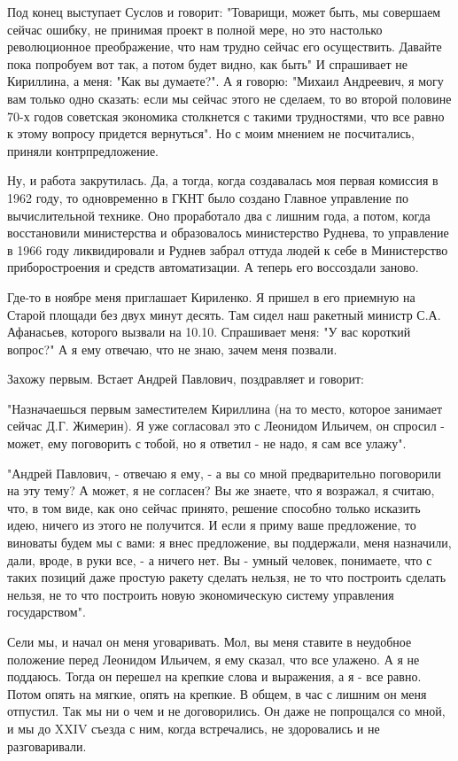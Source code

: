 Под конец выступает Суслов и говорит: "Товарищи, может быть, мы совершаем сейчас
ошибку, не принимая проект в полной мере, но это настолько революционное
преображение, что нам трудно сейчас его осуществить. Давайте пока попробуем вот
так, а потом будет видно, как быть" И спрашивает не Кириллина, а меня: "Как вы
думаете?". А я говорю: "Михаил Андреевич, я могу вам только одно сказать: если
мы сейчас этого не сделаем, то во второй половине 70-х годов советская экономика
столкнется с такими трудностями, что все равно к этому вопросу придется
вернуться". Но с моим мнением не посчитались, приняли контрпредложение.

Ну, и работа закрутилась. Да, а тогда, когда создавалась моя первая комиссия в
1962 году, то одновременно в ГКНТ было создано Главное управление по
вычислительной технике. Оно проработало два с лишним года, а потом, когда
восстановили министерства и образовалось министерство Руднева, то управление в
1966 году ликвидировали и Руднев забрал оттуда людей к себе в Министерство
приборостроения и средств автоматизации. А теперь его воссоздали заново.

Где-то в ноябре меня приглашает Кириленко. Я пришел в его приемную на Старой
площади без двух минут десять. Там сидел наш ракетный министр С.А. Афанасьев,
которого вызвали на 10.10. Спрашивает меня: "У вас короткий вопрос?" А я ему
отвечаю, что не знаю, зачем меня позвали.

Захожу первым. Встает Андрей Павлович, поздравляет и говорит:

"Назначаешься первым заместителем Кириллина (на то место, которое занимает
сейчас Д.Г. Жимерин). Я уже согласовал это с Леонидом Ильичем, он спросил -
может, ему поговорить с тобой, но я ответил - не надо, я сам все улажу".

"Андрей Павлович, - отвечаю я ему, - а вы со мной предварительно поговорили на
эту тему? А может, я не согласен? Вы же знаете, что я возражал, я считаю, что, в
том виде, как оно сейчас принято, решение способно только исказить идею, ничего
из этого не получится. И если я приму ваше предложение, то виноваты будем мы с
вами: я внес предложение, вы поддержали, меня назначили, дали, вроде, в руки
все, - а ничего нет. Вы - умный человек, понимаете, что с таких позиций даже
простую ракету сделать нельзя, не то что построить сделать нельзя, не то что
построить новую экономическую систему управления государством".

Сели мы, и начал он меня уговаривать. Мол, вы меня ставите в неудобное положение
перед Леонидом Ильичем, я ему сказал, что все улажено. А я не поддаюсь. Тогда он
перешел на крепкие слова и выражения, а я - все равно. Потом опять на мягкие,
опять на крепкие. В общем, в час с лишним он меня отпустил. Так мы ни о чем и не
договорились. Он даже не попрощался со мной, и мы до XXIV съезда с ним, когда
встречались, не здоровались и не разговаривали.

